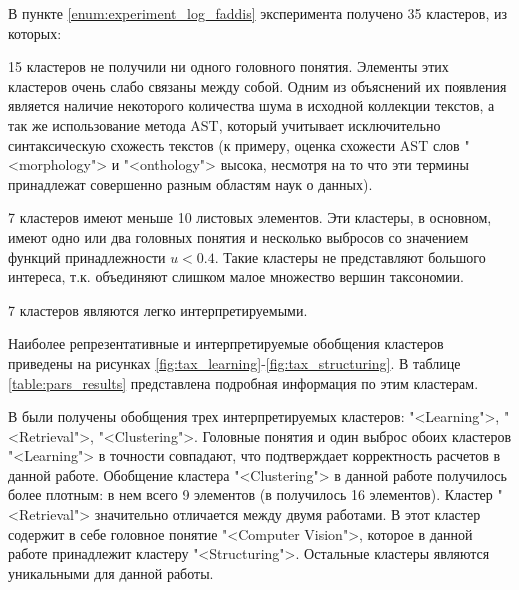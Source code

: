 \documentclass[12pt]{article}
\newenvironment{itemize*}%
{\begin{itemize}%
	\setlength{\itemsep}{0pt}%
	\setlength{\parskip}{0pt}}%
{\end{itemize}}
\begin{document}
В пункте \ref{enum:experiment_log_faddis} эксперимента получено 35 кластеров, из которых:
\begin{itemize*}
	\item 15 кластеров не получили ни одного головного понятия. Элементы этих кластеров очень слабо связаны между собой. Одним из объяснений их появления является наличие некоторого количества шума в исходной коллекции текстов, а так же использование метода AST, который учитывает исключительно синтаксическую схожесть текстов (к примеру, оценка схожести AST слов "<morphology"> и "<onthology"> высока, несмотря на то что эти термины принадлежат совершенно разным областям наук о данных).
	\item 7 кластеров имеют меньше 10 листовых элементов. Эти кластеры, в основном, имеют одно или два головных понятия и несколько выбросов со значением функций принадлежности $u<0.4$. Такие кластеры не представляют большого интереса, т.к. объединяют слишком малое множество вершин таксономии.
	\item 7 кластеров являются легко интерпретируемыми. 
\end{itemize*}

Наиболее репрезентативные и интерпретируемые обобщения кластеров приведены на рисунках \ref{fig:tax_learning}-\ref{fig:tax_structuring}. В таблице \ref{table:pars_results} представлена подробная информация по этим кластерам.

В \cite{mirkin2018preprint} были получены обобщения трех интерпретируемых кластеров: "<Learning">, "<Retrieval">, "<Clustering">.
Головные понятия и один выброс обоих кластеров "<Learning"> в точности совпадают, что подтверждает корректность расчетов в данной работе.
Обобщение кластера "<Clustering"> в данной работе получилось более плотным: в нем всего 9 элементов (в \cite{mirkin2018preprint} получилось 16 элементов).
Кластер "<Retrieval"> значительно отличается между двумя работами. В \cite{mirkin2018preprint} этот кластер содержит в себе головное понятие "<Computer Vision">, которое в данной работе принадлежит кластеру "<Structuring">. Остальные кластеры являются уникальными для данной работы.
\end{document}
